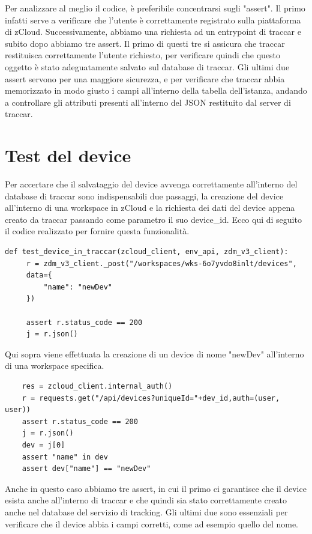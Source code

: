 \documentclass[a4paper,titlepage,12pt]{book}
\begin{document}
\noindent Per analizzare al meglio il codice, è preferibile concentrarsi sugli "assert". Il primo infatti serve a verificare che l'utente è correttamente registrato sulla piattaforma di zCloud. Successivamente, abbiamo una richiesta ad un entrypoint di traccar e subito dopo abbiamo tre assert. Il primo di questi tre si assicura che traccar restituisca correttamente l'utente richiesto, per verificare quindi che questo oggetto è stato adeguatamente salvato sul database di traccar. Gli ultimi due assert servono per una maggiore sicurezza, e per verificare che traccar abbia memorizzato in modo giusto i campi all'interno della tabella dell'istanza, andando a controllare gli attributi presenti all'interno del JSON restituito dal server di traccar.


\section{\sffamily
Test del device}
Per accertare che il salvataggio del device avvenga correttamente all'interno del database di traccar sono indispensabili due passaggi, la creazione del device all'interno di una workspace in zCloud e la richiesta dei dati del device appena creato da traccar passando come parametro il suo device\_id. Ecco qui di seguito il codice realizzato per fornire questa funzionalità.
\begin{verbatim}
def test_device_in_traccar(zcloud_client, env_api, zdm_v3_client):
     r = zdm_v3_client._post("/workspaces/wks-6o7yvdo8inlt/devices",
     data={
         "name": "newDev"
     })
     
     assert r.status_code == 200
     j = r.json()
\end{verbatim}

\noindent Qui sopra viene effettuata la creazione di un device di nome "newDev" all'interno di una workspace specifica.
\pagebreak
\begin{verbatim}
    res = zcloud_client.internal_auth()
    r = requests.get("/api/devices?uniqueId="+dev_id,auth=(user, user))
    assert r.status_code == 200
    j = r.json()
    dev = j[0]
    assert "name" in dev
    assert dev["name"] == "newDev" 
\end{verbatim}

\noindent Anche in questo caso abbiamo tre assert, in cui il primo ci garantisce che il device esista anche all'interno di traccar e che quindi sia stato correttamente creato anche nel database del servizio di tracking. Gli ultimi due sono essenziali per verificare che il device abbia i campi corretti, come ad esempio quello del nome.
\end{document}
